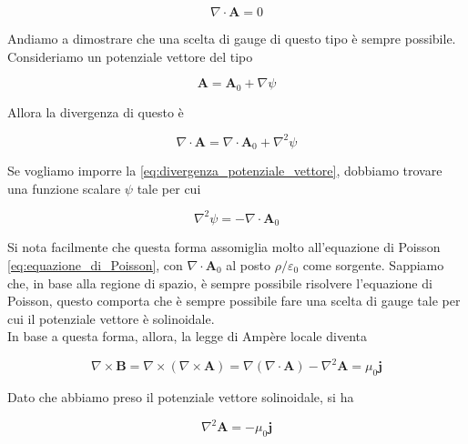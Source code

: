 \begin{tcolorbox}[colback=yellow!10!white, colframe=orange!70!black, boxrule=0.8pt]
\begin{equation} \label{eq:divergenza_potenziale_vettore}
    \nabla \cdot \mathbf{A} = 0
\end{equation}
\end{tcolorbox}

Andiamo a dimostrare che una scelta di gauge di questo tipo è sempre possibile. Consideriamo un potenziale vettore del tipo 

\begin{equation*}
    \mathbf{A} = \mathbf{A}_0 + \nabla \psi 
\end{equation*}

Allora la divergenza di questo è 

\begin{equation*}
    \nabla \cdot \mathbf{A} = \nabla \cdot \mathbf{A}_0 + \nabla ^2 \psi 
\end{equation*}

Se vogliamo imporre la \ref{eq:divergenza_potenziale_vettore}, dobbiamo trovare una funzione scalare $\psi$ tale per cui 

\begin{equation*}
    \nabla^2 \psi = - \nabla \cdot \mathbf{A}_0
\end{equation*}

Si nota facilmente che questa forma assomiglia molto all'equazione di Poisson \ref{eq:equazione_di_Poisson}, con $\nabla \cdot \mathbf{A}_0$ al posto $\rho/\varepsilon_0$ come sorgente. Sappiamo che, in base alla regione di spazio, è sempre possibile risolvere l'equazione di Poisson, questo comporta che è sempre possibile fare una scelta di gauge tale per cui il potenziale vettore è solinoidale. \\

In base a questa forma, allora, la legge di Ampère locale diventa

\begin{equation*}
    \nabla \times \mathbf{B} = \nabla \times (\nabla \times \mathbf{A}) = \nabla (\nabla \cdot \mathbf{A}) - \nabla ^2 \mathbf{A} = \mu_0 \mathbf{j}
\end{equation*}

Dato che abbiamo preso il potenziale vettore solinoidale, si ha 

\begin{tcolorbox}[colback=yellow!10!white, colframe=orange!70!black, boxrule=0.8pt]
\begin{equation}
    \nabla ^2 \mathbf{A} = - \mu_0 \mathbf{j}
\end{equation}
\end{tcolorbox}

